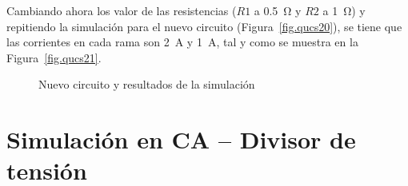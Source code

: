 \documentclass[a4paper,10pt]{article} %
\begin{document}
Cambiando ahora los valor de las resistencias ($R1$ a \qty{0.5}{\ohm} y $R2$ a \qty{1}{\ohm}) y repitiendo la simulación para el nuevo circuito (Figura~\ref{fig.qucs20}), se tiene que las corrientes en cada rama son \qty{2}{\ampere} y \qty{1}{\ampere}, tal y como se muestra en la Figura~\ref{fig.qucs21}.
\begin{figure}
    \centering
    \hfil
    \caption{Nuevo circuito y resultados de la simulación}
\end{figure}


\section{Simulación en CA -- Divisor de tensión}
\end{document}
